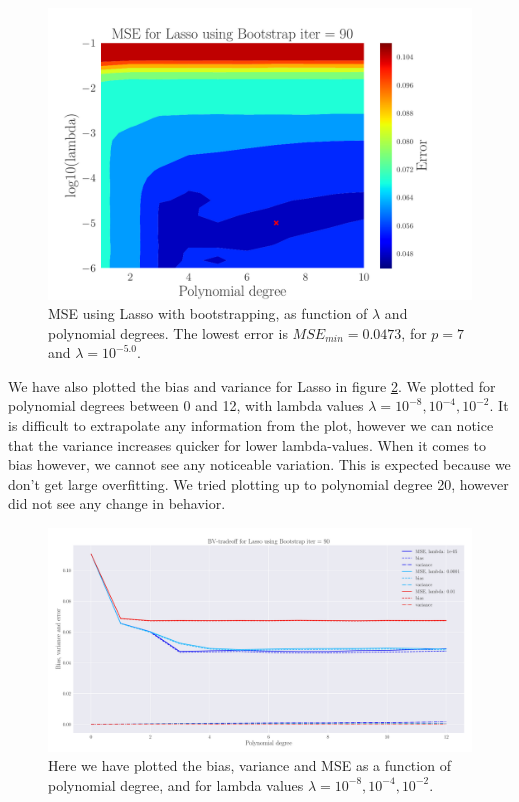\documentclass[reprint,english,notitlepage,aps,nobalancelastpage,nofootinbib]{revtex4-1}  %
\begin{document}
\begin{figure}[b]
	\includegraphics[width=0.8\linewidth]{Contour_PL_Lasso_Bootstrap90_n30_eps0.2_p1_10_lmbm1_m6.pdf}
	\caption{MSE using Lasso with bootstrapping, as function of $\lambda$ and polynomial degrees. The lowest error is $MSE_{min}=0.0473$, for $p=7$ and $\lambda = 10^{-5.0}$.}
	\label{fig:Lasso_boot_heatmap}
\end{figure}

We have also plotted the bias and variance for Lasso in figure \ref{fig:Lasso_BVT}. We plotted for polynomial degrees between 0 and 12, with lambda values $\lambda = 10^{-8}, 10^{-4}, 10^{-2}$. It is difficult to extrapolate any information from the plot, however we can notice that the variance increases quicker for lower lambda-values. When it comes to bias however, we cannot see any noticeable variation. This is expected because we don't get large overfitting. We tried plotting up to polynomial degree 20, however did not see any change in behavior.

\begin{figure}[h]
	\includegraphics[width=\linewidth]{LBVT_Lasso_Bootstrap_n30_eps0_2_p12_lmbm5_m2.pdf}
	\caption{Here we have plotted the bias, variance and MSE as a function of polynomial degree, and for lambda values $\lambda = 10^{-8}, 10^{-4}, 10^{-2}$.}
	\label{fig:Lasso_BVT}
\end{figure}
\end{document}
